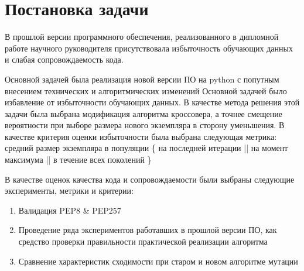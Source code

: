 \documentclass[utf8,usehyperref,12pt]{G7-32}
\begin{document}
\chapter{Постановка задачи}
В прошлой версии программного обеспечения, реализованного в дипломной работе научного руководителя присутствовала избыточность обучающих данных и слабая сопровождаемость кода.

Основной задачей была реализация новой версии ПО на python с попутным внесением технических и алгоритмических изменений
Основной задачей было избавление от избыточности обучающих данных. В качестве метода решения этой задачи была выбрана модификация алгоритма кроссовера, а точнее смещение вероятности при выборе размера нового экземпляра в сторону уменьшения. В качестве критерия оценки избыточности была выбрана следующая метрика: средний размер экземпляра в популяции \{ на последней итерации || на момент максимума || в течение всех поколений \}


В качестве оценок качества кода и сопровождаемости были выбраны следующие эксперименты, метрики и критерии:
\begin{enumerate}
\item Валидация PEP8 \& PEP257
\item Проведение ряда экспериментов работавших в прошлой версии ПО, как средство проверки правильности практической реализации алгоритма
\item Сравнение характеристик сходимости при старом и новом алгоритме мутации
\end{enumerate}
\end{document}
